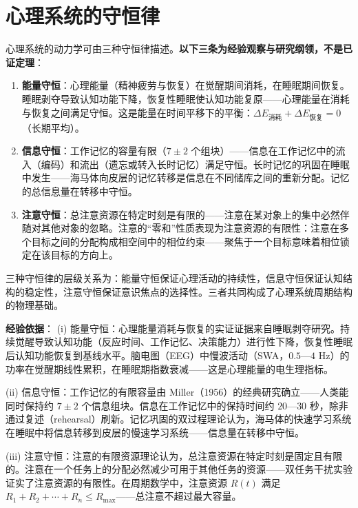 \section{心理系统的守恒律}

\begin{remark}\label{thm:psychological_conservation}
心理系统的动力学可由三种守恒律描述。\textbf{以下三条为经验观察与研究纲领，不是已证定理}：
\begin{enumerate}[label=(\roman*)]
    \item \textbf{能量守恒}：心理能量（精神疲劳与恢复）在觉醒期间消耗，在睡眠期间恢复。睡眠剥夺导致认知功能下降，恢复性睡眠使认知功能复原——心理能量在消耗与恢复之间满足守恒。这是能量在时间平移下的平衡：$\Delta E_{\text{消耗}} + \Delta E_{\text{恢复}} = 0$（长期平均）。
    \item \textbf{信息守恒}：工作记忆的容量有限（$7 \pm 2$ 个组块）——信息在工作记忆中的流入（编码）和流出（遗忘或转入长时记忆）满足守恒。长时记忆的巩固在睡眠中发生——海马体向皮层的记忆转移是信息在不同储库之间的重新分配。记忆的总信息量在转移中守恒。
    \item \textbf{注意守恒}：总注意资源在特定时刻是有限的——注意在某对象上的集中必然伴随对其他对象的忽略。注意的“零和”性质表现为注意资源的有限性：注意在多个目标之间的分配构成相空间中的相位约束——聚焦于一个目标意味着相位锁定在该目标的方向上。
\end{enumerate}
三种守恒律的层级关系为：能量守恒保证心理活动的持续性，信息守恒保证认知结构的稳定性，注意守恒保证意识焦点的选择性。三者共同构成了心理系统周期结构的物理基础。

\textbf{经验依据}：
(i) 能量守恒：心理能量消耗与恢复的实证证据来自睡眠剥夺研究。持续觉醒导致认知功能（反应时间、工作记忆、决策能力）进行性下降，恢复性睡眠后认知功能恢复到基线水平。脑电图（EEG）中慢波活动（SWA，$0.5$—$4$ Hz）的功率在觉醒期线性累积，在睡眠期指数衰减——这是心理能量的电生理指标。

(ii) 信息守恒：工作记忆的有限容量由 Miller（1956）的经典研究确立——人类能同时保持约 $7 \pm 2$ 个信息组块。信息在工作记忆中的保持时间约 $20$—$30$ 秒，除非通过复述（rehearsal）刷新。记忆巩固的双过程理论认为，海马体的快速学习系统在睡眠中将信息转移到皮层的慢速学习系统——信息量在转移中守恒。

(iii) 注意守恒：注意的有限资源理论认为，总注意资源在特定时刻是固定且有限的。注意在一个任务上的分配必然减少可用于其他任务的资源——双任务干扰实验证实了注意资源的有限性。在周期数学中，注意资源 $R(t)$ 满足 $R_1 + R_2 + \cdots + R_n \le R_{\max}$——总注意不超过最大容量。
\end{remark}

